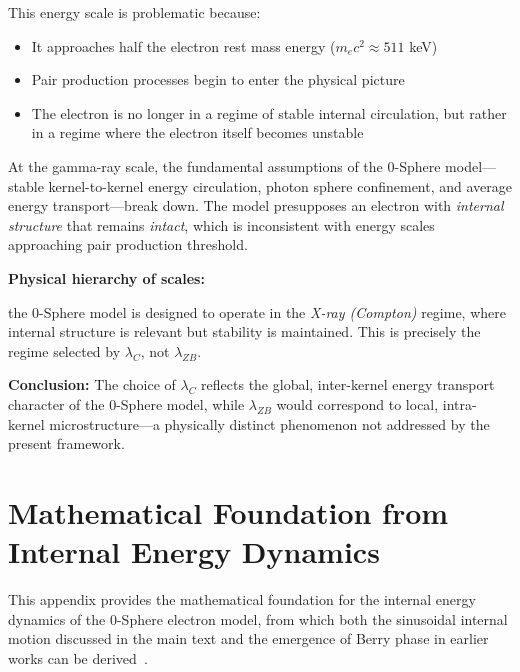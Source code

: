 \documentclass[%
 reprint,
 amsmath,amssymb,
 aps,
 prb,
]{revtex4-2}
\numberwithin{equation}{section}
\begin{document}
This energy scale is problematic because:
\begin{itemize}
\item It approaches half the electron rest mass energy ($m_e c^2 \approx 511$ keV)
\item Pair production processes begin to enter the physical picture
\item The electron is no longer in a regime of stable internal circulation, but rather in a regime where the electron itself becomes unstable
\end{itemize}

At the gamma-ray scale, the fundamental assumptions of the 0-Sphere model—stable kernel-to-kernel energy circulation, photon sphere confinement, and average energy transport—break down. The model presupposes an electron with \textit{internal structure} that remains \textit{intact}, which is inconsistent with energy scales approaching pair production threshold.

\vspace{0.5cm}

\noindent\textbf{Physical hierarchy of scales:}

\vspace{0.3cm}

the 0-Sphere model is designed to operate in the \textit{X-ray (Compton)} regime, where internal structure is relevant but stability is maintained. This is precisely the regime selected by $\lambda_C$, not $\lambda_{ZB}$.

\vspace{1.0cm}

\noindent\textbf{Conclusion:} The choice of $\lambda_C$ reflects the global, inter-kernel energy transport character of the 0-Sphere model, while $\lambda_{ZB}$ would correspond to local, intra-kernel microstructure—a physically distinct phenomenon not addressed by the present framework.

\clearpage

\section{Mathematical Foundation from Internal Energy Dynamics}
\label{sec:internal_energy_dynamics}

This appendix provides the mathematical foundation for the internal energy dynamics of the 0-Sphere electron model, from which both the sinusoidal internal motion discussed in the main text and the emergence of Berry phase in earlier works can be derived~\cite{hanamura17765409}.
\end{document}
